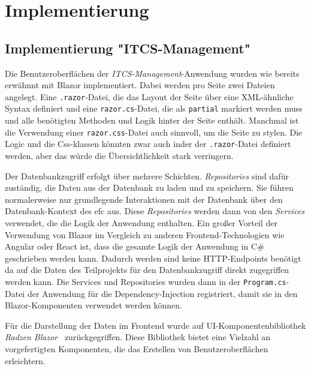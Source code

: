 \chapter{Implementierung}\label{ch:Implementierung}
\section{Implementierung "ITCS-Management"}\label{sec:ImplementierungITCS-Management}
    Die Benutzeroberflächen der \emph{ITCS-Management}-Anwendung wurden wie bereits erwähnnt mit Blazor implementiert. Dabei werden pro Seite 
    zwei Dateien angelegt. Eine \texttt{.razor}-Datei, die das Layout der Seite über eine XML-ähnliche Syntax definiert
    und eine \texttt{razor.cs}-Datei, die als \texttt{partial} markiert werden muss und alle benötigten Methoden und Logik hinter der Seite enthält. Manchmal ist die Verwendung einer \texttt{razor.css}-Datei 
    auch sinnvoll, um die Seite zu stylen. Die Logic und die Css-klassen könnten zwar auch inder der \texttt{.razor}-Datei definiert werden,
    aber das würde die Übersichtlichkeit stark verringern. 
    
    Der Datenbankzugriff erfolgt über mehrere Schichten. \emph{Repositories} sind dafür zuständig, 
    die Daten aus der Datenbank zu laden und zu speichern. Sie führen normalerweise nur grundlegende Interaktionen mit der Datenbank über den Datenbank-Kontext des \gls{efc} aus.
    Diese \emph{Repositories} werden dann von den \emph{Services} verwendet, die die Logik der Anwendung enthalten. Ein großer 
    Vorteil der Verwendung von Blazor im Vergleich zu anderen Frontend-Technologien wie Angular oder React ist, dass die gesamte Logik der Anwendung in
    C\# geschrieben werden kann. Dadurch werden sind keine HTTP-Endpoints benötigt da auf die Daten des Teilprojekts für den Datenbankzugriff direkt zugegriffen werden kann.
    Die Services und Repositories wurden dann in der \texttt{Program.cs}-Datei der Anwendung für die Dependency-Injection registriert,
    damit sie in den Blazor-Komponenten verwendet werden können.

    Für die Darstellung der Daten im Frontend wurde auf UI-Komponentenbibliothek \emph{Radzen Blazor}~\cite{radzen} zurückgegriffen. 
    Diese Bibliothek bietet eine Vielzahl an vorgefertigten Komponenten, die das Erstellen von Benutzeroberflächen erleichtern.
    